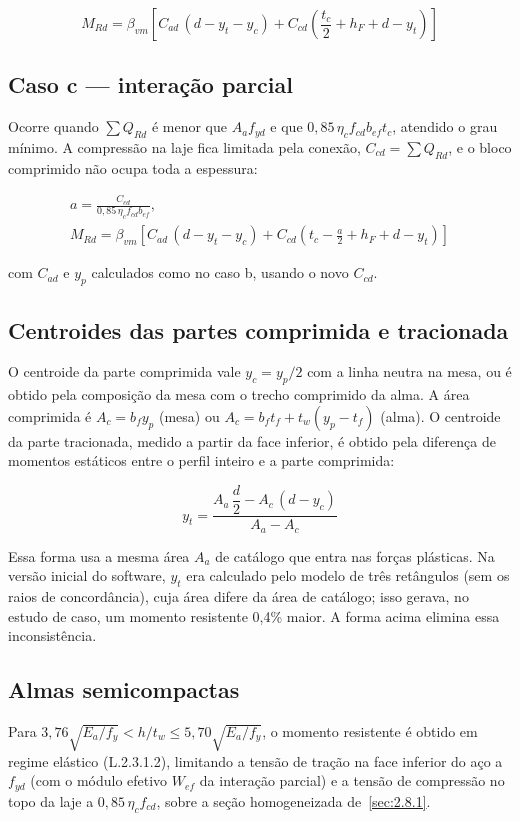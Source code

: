 \[
  M_{Rd} = \beta_{vm}\left[ C_{ad}\,(d - y_t - y_c) + C_{cd}\left(\frac{t_c}{2} + h_F + d - y_t\right) \right]
\]

\subsection{Caso c --- interação parcial}
Ocorre quando $\sum Q_{Rd}$ é menor que $A_a f_{yd}$ e que $0{,}85\,\eta_c f_{cd} b_{ef} t_c$, atendido o grau mínimo. A compressão na laje fica limitada pela conexão, $C_{cd} = \sum Q_{Rd}$, e o bloco comprimido não ocupa toda a espessura:

\begin{gather*}
  a = \frac{C_{cd}}{0{,}85\,\eta_c f_{cd} b_{ef}}, \\
  M_{Rd} = \beta_{vm}\left[ C_{ad}\,(d - y_t - y_c) + C_{cd}\left(t_c - \frac{a}{2} + h_F + d - y_t\right) \right]
\end{gather*}

com $C_{ad}$ e $y_p$ calculados como no caso b, usando o novo $C_{cd}$.

\subsection{Centroides das partes comprimida e tracionada}
O centroide da parte comprimida vale $y_c = y_p/2$ com a linha neutra na mesa, ou é obtido pela composição da mesa com o trecho comprimido da alma. A área comprimida é $A_c = b_f y_p$ (mesa) ou $A_c = b_f t_f + t_w (y_p - t_f)$ (alma). O centroide da parte tracionada, medido a partir da face inferior, é obtido pela diferença de momentos estáticos entre o perfil inteiro e a parte comprimida:

\[
  y_t = \frac{A_a\,\dfrac{d}{2} - A_c\,(d - y_c)}{A_a - A_c}
\]

Essa forma usa a mesma área $A_a$ de catálogo que entra nas forças plásticas. Na versão inicial do software, $y_t$ era calculado pelo modelo de três retângulos (sem os raios de concordância), cuja área difere da área de catálogo; isso gerava, no estudo de caso, um momento resistente 0,4\% maior. A forma acima elimina essa inconsistência.

\subsection{Almas semicompactas}
Para $3{,}76\sqrt{E_a/f_y} < h/t_w \le 5{,}70\sqrt{E_a/f_y}$, o momento resistente é obtido em regime elástico (L.2.3.1.2), limitando a tensão de tração na face inferior do aço a $f_{yd}$ (com o módulo efetivo $W_{ef}$ da interação parcial) e a tensão de compressão no topo da laje a $0{,}85\,\eta_c f_{cd}$, sobre a seção homogeneizada de~\ref{sec:2.8.1}.

